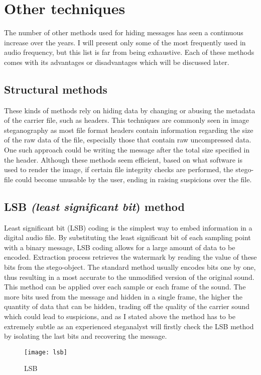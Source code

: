 \documentclass[12pt]{report}
\begin{document}
\section{Other techniques}
The number of other methods used for hiding messages has seen a continuous increase over the years. I will present only some of the most frequently used in audio frequency, but this list is far from being exhaustive. Each of these methods comes with its advantages or disadvantages which will be discussed later.
\subsection{Structural methods}
These kinds of methods rely on hiding data by changing or abusing the metadata of the carrier file, such as headers. This techniques are commonly seen in image steganography as most file format headers contain information regarding the size of the raw data of the file, especially those that contain raw uncompressed data. One such approach could be writing the message after the total size specified in the header. Although these methods seem efficient, based on what software is used to render the image, if certain file integrity checks are performed, the stego-file could become unusable by the user, ending in raising suspicions over the file.

\subsection{LSB \emph{(least significant bit}) method}
Least significant bit  (LSB)  coding is the simplest way to embed information in a digital audio file.  By substituting the least significant bit of each sampling point with a binary message, LSB 
coding allows for a large amount of data to be encoded. Extraction process retrieves the watermark by reading the value of these bits from the stego-object.
The standard method usually encodes bits one by one, thus resulting in a most accurate to the unmodified version of the original sound. This method can be applied over each sample or each frame of the sound. The more bits used from the message and hidden in a single frame, the higher the quantity of data that can be hidden, trading off the quality of the carrier sound which could lead to suspicions, and as I stated above the method has to be extremely subtle as an experienced steganalyst will firstly check the LSB method by isolating the last bits and recovering the message.

\begin{figure}[h]
\centering
\texttt{[image: lsb]}
\caption{LSB}
\label{fig:LSB}
\end{figure}
\end{document}
